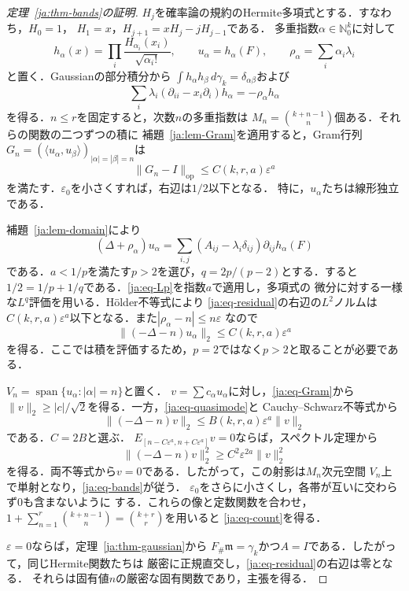 \documentclass[12pt]{amsart}
\theoremstyle{definition}
\theoremstyle{remark}
\numberwithin{equation}{section}
\newcommand{\N}{\mathbb{N}}
\newcommand{\m}{\mathfrak m}
\theoremstyle{jpplain}
\begin{document}
\begin{proof}[定理~\ref{ja:thm-bands}の証明]
$H_j$を確率論の規約のHermite多項式とする．すなわち，$H_0=1$，
$H_1=x$，$H_{j+1}=xH_j-jH_{j-1}$である．
多重指数$\alpha\in\N_0^k$に対して
\[
 h_\alpha(x)=\prod_i\frac{H_{\alpha_i}(x_i)}{\sqrt{\alpha_i!}},
 \qquad u_\alpha=h_\alpha(F),\qquad
 \rho_\alpha=\sum_i\alpha_i\lambda_i
\]
と置く．Gaussianの部分積分から
$\int h_\alpha h_\beta\,d\gamma_k=\delta_{\alpha\beta}$および
\[
 \sum_i\lambda_i(\partial_{ii}-x_i\partial_i)h_\alpha
 =-\rho_\alpha h_\alpha
\]
を得る．$n\leq r$を固定すると，次数$n$の多重指数は
$M_n=\binom{k+n-1}{n}$個ある．それらの関数の二つずつの積に
補題~\ref{ja:lem-Gram}を適用すると，Gram行列
$G_n=(\langle u_\alpha,u_\beta\rangle)_{|\alpha|=|\beta|=n}$は
\begin{equation}\label{ja:eq-Gram}
 \|G_n-I\|_{\mathrm{op}}\leq C(k,r,a)\varepsilon^a
\end{equation}
を満たす．$\varepsilon_0$を小さくすれば，右辺は$1/2$以下となる．
特に，$u_\alpha$たちは線形独立である．

補題~\ref{ja:lem-domain}により
\begin{equation}\label{ja:eq-residual}
 (\Delta+\rho_\alpha)u_\alpha
 =\sum_{i,j}(A_{ij}-\lambda_i\delta_{ij})
                   \partial_{ij}h_\alpha(F)
\end{equation}
である．$a<1/p$を満たす$p>2$を選び，$q=2p/(p-2)$とする．すると
$1/2=1/p+1/q$である．\eqref{ja:eq-Lp}を指数$a$で適用し，多項式の
微分に対する一様な$L^q$評価を用いる．Hölder不等式により
\eqref{ja:eq-residual}の右辺の$L^2$ノルムは
$C(k,r,a)\varepsilon^a$以下となる．また$|\rho_\alpha-n|\leq n\varepsilon$
なので
\begin{equation}\label{ja:eq-quasimode}
 \|(-\Delta-n)u_\alpha\|_2\leq C(k,r,a)\varepsilon^a
\end{equation}
を得る．ここでは積を評価するため，$p=2$ではなく$p>2$と取ることが必要である．

$V_n=\operatorname{span}\{u_\alpha:|\alpha|=n\}$と置く．
$v=\sum c_\alpha u_\alpha$に対し，\eqref{ja:eq-Gram}から
$\|v\|_2\geq|c|/\sqrt2$を得る．一方，\eqref{ja:eq-quasimode}と
Cauchy--Schwarz不等式から
\[
 \|(-\Delta-n)v\|_2\leq B(k,r,a)\varepsilon^a\|v\|_2
\]
である．$C=2B$と選ぶ．
$E_{[n-C\varepsilon^a,n+C\varepsilon^a]}v=0$ならば，スペクトル定理から
\[
 \|(-\Delta-n)v\|_2^2
 \geq C^2\varepsilon^{2a}\|v\|_2^2
\]
を得る．両不等式から$v=0$である．したがって，この射影は$M_n$次元空間
$V_n$上で単射となり，\eqref{ja:eq-bands}が従う．
$\varepsilon_0$をさらに小さくし，各帯が互いに交わらず$0$も含まないように
する．これらの像と定数関数を合わせ，
$1+\sum_{n=1}^r\binom{k+n-1}{n}=\binom{k+r}{r}$を用いると
\eqref{ja:eq-count}を得る．

$\varepsilon=0$ならば，定理~\ref{ja:thm-gaussian}から
$F_\#\m=\gamma_k$かつ$A=I$である．したがって，同じHermite関数たちは
厳密に正規直交し，\eqref{ja:eq-residual}の右辺は零となる．
それらは固有値$n$の厳密な固有関数であり，主張を得る．
\end{proof}
\end{document}
